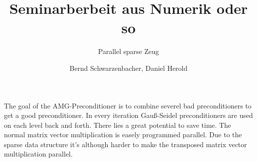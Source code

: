 \documentclass[a4paper,11pt]{scrartcl}
\title{Seminarberbeit aus Numerik oder so}
\subtitle{Parallel sparse Zeug}
\author{Bernd Schwarzenbacher, Daniel Herold}
\begin{document}
\maketitle
\tableofcontents

\pagebreak


The goal of the AMG-Preconditioner is to combine severel bad preconditioners to
get a good preconditioner.
In every iteration Gauß-Seidel preconditioners are used on each level back and
forth. There lies a great potential to save time.
The normal matrix vector multiplication is easely programmed parallel. Due to
the sparse data structure it's although harder to make the transposed matrix
vector multiplication parallel.









\end{document}
